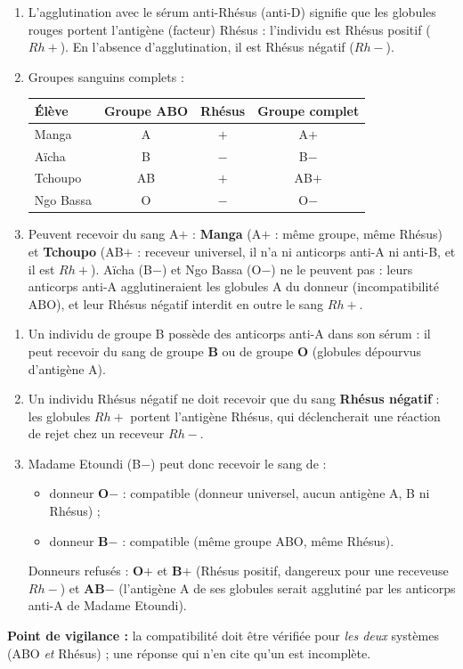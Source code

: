 \documentclass[11pt]{article}
\begin{document}
\begin{corrige}
\begin{enumerate}
\item L'agglutination avec le sérum anti-Rhésus (anti-D) signifie que les globules rouges portent l'antigène (facteur) Rhésus : l'individu est Rhésus positif ($Rh+$). En l'absence d'agglutination, il est Rhésus négatif ($Rh-$).
\item Groupes sanguins complets :
\begin{center}
\begin{tabular}{|l|c|c|c|}
\hline
\rowcolor{popblueL} \textbf{Élève} & \textbf{Groupe ABO} & \textbf{Rhésus} & \textbf{Groupe complet} \\
\hline
Manga & A & $+$ & A$+$ \\
\hline
Aïcha & B & $-$ & B$-$ \\
\hline
Tchoupo & AB & $+$ & AB$+$ \\
\hline
Ngo Bassa & O & $-$ & O$-$ \\
\hline
\end{tabular}
\end{center}
\item Peuvent recevoir du sang A$+$ : \textbf{Manga} (A$+$ : même groupe, même Rhésus) et \textbf{Tchoupo} (AB$+$ : receveur universel, il n'a ni anticorps anti-A ni anti-B, et il est $Rh+$). Aïcha (B$-$) et Ngo Bassa (O$-$) ne le peuvent pas : leurs anticorps anti-A agglutineraient les globules A du donneur (incompatibilité ABO), et leur Rhésus négatif interdit en outre le sang $Rh+$.
\end{enumerate}
\end{corrige}

\begin{corrige}
\begin{enumerate}
\item Un individu de groupe B possède des anticorps anti-A dans son sérum : il peut recevoir du sang de groupe \textbf{B} ou de groupe \textbf{O} (globules dépourvus d'antigène A).
\item Un individu Rhésus négatif ne doit recevoir que du sang \textbf{Rhésus négatif} : les globules $Rh+$ portent l'antigène Rhésus, qui déclencherait une réaction de rejet chez un receveur $Rh-$.
\item Madame Etoundi (B$-$) peut donc recevoir le sang de :
\begin{itemize}
\item donneur \textbf{O$-$} : compatible (donneur universel, aucun antigène A, B ni Rhésus) ;
\item donneur \textbf{B$-$} : compatible (même groupe ABO, même Rhésus).
\end{itemize}
Donneurs refusés : \textbf{O$+$} et \textbf{B$+$} (Rhésus positif, dangereux pour une receveuse $Rh-$) et \textbf{AB$-$} (l'antigène A de ses globules serait agglutiné par les anticorps anti-A de Madame Etoundi).
\end{enumerate}
\textbf{Point de vigilance :} la compatibilité doit être vérifiée pour \emph{les deux} systèmes (ABO \emph{et} Rhésus) ; une réponse qui n'en cite qu'un est incomplète.
\end{corrige}
\end{document}
